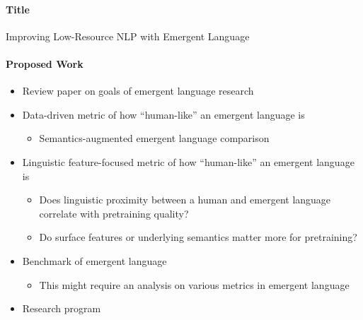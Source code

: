 
\paragraph{Title}
Improving Low-Resource NLP with Emergent Language

\paragraph{Proposed Work}
\begin{itemize}
    \item Review paper on goals of emergent language research
    \item Data-driven metric of how ``human-like'' an emergent language is
        \begin{itemize}
        \item Semantics-augmented emergent language comparison
        \end{itemize}
    \item Linguistic feature-focused metric of how ``human-like'' an emergent language is
        \begin{itemize}
        \item Does linguistic proximity between a human and emergent language correlate with pretraining quality?
        \item Do surface features or underlying semantics matter more for pretraining?
        \end{itemize}
    \item Benchmark of emergent language
        \begin{itemize}
        \item This might require an analysis on various metrics in emergent language
        \end{itemize}
    \item Research program
\end{itemize}


